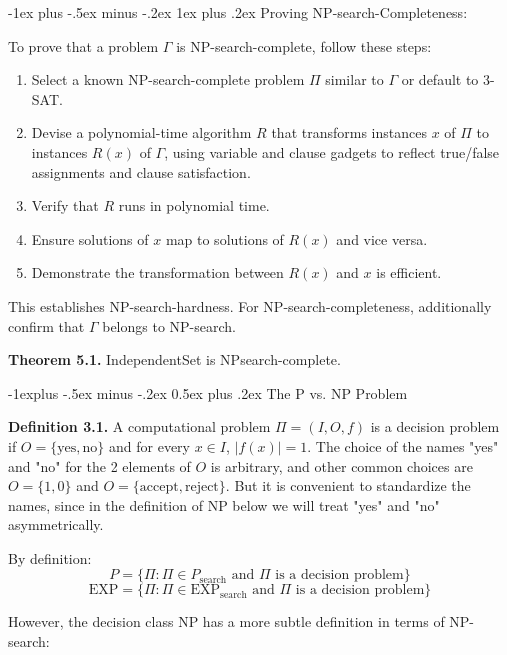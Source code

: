 \documentclass[10pt,landscape]{article}
\makeatletter
\renewcommand{\subsection}{\@startsection{subsection}{2}{0mm}%
                                {-1explus -.5ex minus -.2ex}%
                                {0.5ex plus .2ex}%
                                {\normalfont\normalsize\bfseries}}
\renewcommand{\subsubsection}{\@startsection{subsubsection}{3}{0mm}%
                                {-1ex plus -.5ex minus -.2ex}%
                                {1ex plus .2ex}%
                                {\normalfont\small\bfseries}}
\makeatother
\begin{document}
\begin{multicols*}{3}
\subsubsection{Proving NP-search-Completeness:}

To prove that a problem \( \Gamma \) is NP-search-complete, follow these steps:

\begin{enumerate}
  \item Select a known NP-search-complete problem \( \Pi \) similar to \( \Gamma \) or default to 3-SAT.
  \item Devise a polynomial-time algorithm \( R \) that transforms instances \( x \) of \( \Pi \) to instances \( R(x) \) of \( \Gamma \), using variable and clause gadgets to reflect true/false assignments and clause satisfaction.
  \item Verify that \( R \) runs in polynomial time.
  \item Ensure solutions of \( x \) map to solutions of \( R(x) \) and vice versa.
  \item Demonstrate the transformation between \( R(x) \) and \( x \) is efficient.
\end{enumerate}

This establishes NP-search-hardness. For NP-search-completeness, additionally confirm that \( \Gamma \) belongs to NP-search.

 \textbf{Theorem 5.1.} IndependentSet is NPsearch-complete.

\subsection{The P vs. NP Problem}

\textbf{Definition 3.1.} A computational problem $\Pi = (I, O, f)$ is a decision problem if $O = \{ \text{yes}, \text{no} \}$ and for every $x \in I$, $|f(x)| = 1$. The choice of the names "yes" and "no" for the 2 elements of $O$ is arbitrary, and other common choices are $O = \{1, 0\}$ and $O = \{\text{accept}, \text{reject}\}$. But it is convenient to standardize the names, since in the definition of NP below we will treat "yes" and "no" asymmetrically.

By definition:
\[ P = \{ \Pi : \Pi \in P_{\text{search}} \text{ and } \Pi \text{ is a decision problem} \} \]
\[ \text{EXP} = \{ \Pi : \Pi \in \text{EXP}_{\text{search}} \text{ and } \Pi \text{ is a decision problem} \} \]

However, the decision class NP has a more subtle definition in terms of NP-search:


\end{multicols*}
\end{document}
